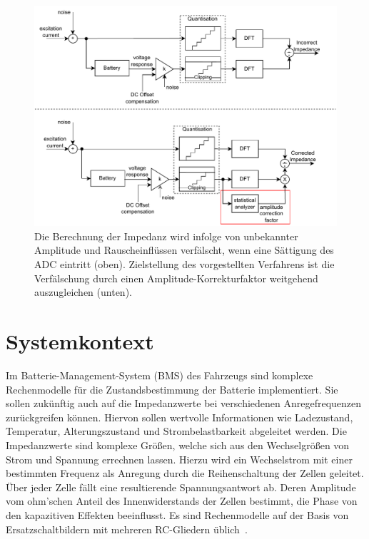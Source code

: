 \begin{figure}[tbh!] 
	\centering 
	\includegraphics[width=1\textwidth]{../img/system.pdf}
	\caption{Die Berechnung der Impedanz wird infolge von unbekannter Amplitude und Rauscheinflüssen verfälscht, wenn eine Sättigung des ADC eintritt (oben). Zielstellung des vorgestellten Verfahrens ist die Verfälschung durch einen Amplitude-Korrekturfaktor weitgehend auszugleichen (unten).}
	\label{fig:system}
\end{figure}

\section{Systemkontext}
Im Batterie-Management-System (BMS)  des Fahrzeugs sind komplexe Rechenmodelle für die Zustandsbestimmung der Batterie implementiert. Sie sollen zukünftig auch auf die Impedanzwerte bei verschiedenen Anregefrequenzen zurückgreifen können. Hiervon sollen wertvolle Informationen wie Ladezustand, Temperatur, Alterungszustand und Strombelastbarkeit abgeleitet werden. Die Impedanzwerte sind komplexe Größen, welche sich aus den Wechselgrößen von Strom und Spannung errechnen lassen. Hierzu wird ein Wechselstrom mit einer bestimmten Frequenz als Anregung durch die Reihenschaltung der Zellen geleitet. Über jeder Zelle fällt eine resultierende Spannungsantwort ab. Deren Amplitude vom ohm'schen Anteil des Innenwiderstands der Zellen bestimmt, die Phase von den kapazitiven Effekten beeinflusst. Es sind Rechenmodelle auf der Basis von Ersatzschaltbildern mit mehreren RC-Gliedern üblich~\cite{KeilJossen-2012}.

